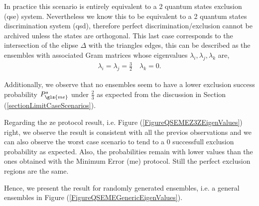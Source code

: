 \documentclass[12pt,letterpaper]{article}
\begin{document}
In practice this scenario is entirely equivalent to a 2 quantum states exclusion (\gls{qse}) system. Nevertheless we know this to be equivalent to a 2 quantum states discrimination system (\gls{qsd}), therefore perfect discrimination/exclusion cannot be archived unless the states are orthogonal. This last case corresponds to the intersection of the elipse $\Delta$ with the triangles edges, this can be described as the ensembles with associated Gram matrices whose eigenvalues $\lambda_i,\lambda_j,\lambda_k$ are,
\begin{align*}
	\lambda_i=\lambda_j=\frac{3}{2}\quad\lambda_k=0.
\end{align*}

Additionally, we observe that no ensembles seem to have a lower exclusion success probability $P_{\gls{me}}^s$ under $\frac{2}{3}$ as expected from the discussion in Section (\ref{sectionLimitCaseScenarios}).




Regarding the \gls{ze} protocol result, i.e. Figure (\ref{FigureQSEMEZ3ZEigenValues}) right, we observe the result is consistent with all the previos observations and we can also observe the worst case scenario to tend to a 0 successfull exclusion probability as expected. Also, the probabilities remain with lower values than the ones obtained with the Minimum Error (\gls{me}) protocol. Still the perfect exclusion regions are the same.

Hence, we present the result for randomly generated ensembles, i.e. a general ensembles  in Figure (\ref{FigureQSEMEGenericEigenValues}).
\end{document}
